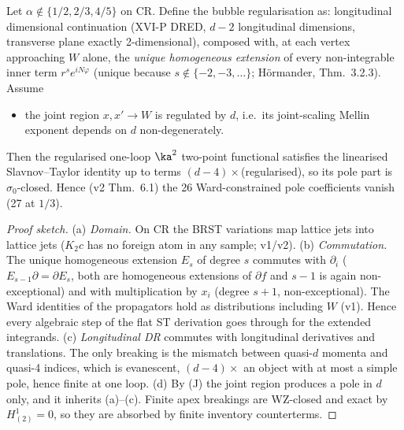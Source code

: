 \begin{proposition}\label{prop:hreg}
Let $\alpha\notin\{1/2,2/3,4/5\}$ on CR. Define the bubble regularisation as: longitudinal dimensional continuation (XVI-P DRED, $d-2$ longitudinal dimensions, transverse plane exactly 2-dimensional), composed with, at each vertex approaching $W$ alone, the \emph{unique homogeneous extension} of every non-integrable inner term $r^se^{iN\varphi}$ (unique because $s\notin\{-2,-3,\dots\}$; Hörmander, Thm.~3.2.3). Assume
\begin{itemize}
\item[(J)] the joint region $x,x'\to W$ is regulated by $d$, i.e.\ its joint-scaling Mellin exponent depends on $d$ non-degenerately.
\end{itemize}
Then the regularised one-loop $\ka^2$ two-point functional satisfies the linearised Slavnov--Taylor identity up to terms $(d-4)\times$(regularised), so its pole part is $\sigma_0$-closed. Hence (v2 Thm.~6.1) the 26 Ward-constrained pole coefficients vanish (27 at $1/3$).
\end{proposition}
\begin{proof}[Proof sketch]
(a) \emph{Domain.} On CR the BRST variations map lattice jets into lattice jets ($K_2c$ has no foreign atom in any sample; v1/v2).
(b) \emph{Commutation.} The unique homogeneous extension $E_s$ of degree $s$ commutes with $\partial_i$ ($E_{s-1}\partial=\partial E_s$, both are homogeneous extensions of $\partial f$ and $s-1$ is again non-exceptional) and with multiplication by $x_i$ (degree $s+1$, non-exceptional). The Ward identities of the propagators hold as distributions including $W$ (v1). Hence every algebraic step of the flat ST derivation goes through for the extended integrands.
(c) \emph{Longitudinal DR} commutes with longitudinal derivatives and translations. The only breaking is the mismatch between quasi-$d$ momenta and quasi-4 indices, which is evanescent, $(d-4)\times$ an object with at most a simple pole, hence finite at one loop.
(d) By (J) the joint region produces a pole in $d$ only, and it inherits (a)--(c). Finite apex breakings are WZ-closed and exact by $H^1_{(2)}=0$, so they are absorbed by finite inventory counterterms.
\end{proof}
